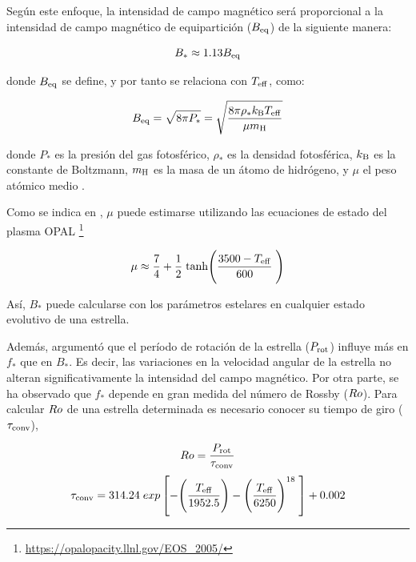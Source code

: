 Según este enfoque, la intensidad de campo magnético será proporcional a la intensidad de campo magnético de equipartición ($B_{\mathrm{eq}}$) de la siguiente manera:
 
\begin{equation}
	B_* \approx 1.13 B_{\mathrm{eq}} \label{eq:mf_bstar}
\end{equation}

donde $B_{\mathrm{eq}}$ se define, y por tanto se relaciona con $T_{\mathrm{eff}}$, como:

\begin{equation}
	B_{\mathrm{eq}} = \sqrt{8\pi P_*} = \sqrt{\frac{8\pi\rho_* k_{\mathrm{B}} T_{\mathrm{eff}}}{\mu m_{\mathrm{H}}}}\label{eq:mf_beq}    
\end{equation}

donde $P_*$ es la presión del gas fotosférico, $\rho_*$ es la densidad fotosférica, $k_{\mathrm{B}}$ es la constante de Boltzmann, $m_{\mathrm{H}}$ es la masa de un átomo de hidrógeno, y $\mu$ el peso atómico medio \citep{Cranmer2011}. \par

Como se indica en \cite{Cranmer2011}, $\mu$ puede estimarse utilizando las ecuaciones de estado del plasma OPAL \footnote{\url{https://opalopacity.llnl.gov/EOS_2005/}}

\begin{equation}
	\mu \approx \frac{7}{4} + \frac{1}{2} \; \textrm{tanh}\Bigg(\frac{3500-T_{\mathrm{eff}}}{600}\;\Bigg) \label{eq:mf_atom_weight}
\end{equation}

Así, $B_*$ puede calcularse con los parámetros estelares en cualquier estado evolutivo de una estrella.\par

Además, \citet{Cranmer2011} argumentó que el período de rotación de la estrella ($P_{\mathrm{rot}}$) influye más en $f_*$ que en $B_*$. Es decir, las variaciones en la velocidad angular de la estrella no alteran significativamente la intensidad del campo magnético. Por otra parte, se ha observado que $f_*$ depende en gran medida del número de Rossby ($Ro$). Para calcular $Ro$ de una estrella determinada es necesario conocer su tiempo de giro ($\tau_{\mathrm{conv}}$),

\begin{equation}
	Ro = \frac{P_{\mathrm{rot}}}{\tau_{\mathrm{conv}}} \label{eq:mf_rossby}
\end{equation}
\begin{equation}
	\tau_{\mathrm{conv}} = 314.24\;exp\left[-\Bigg(\frac{T_{\mathrm{eff}}}{1952.5}\Bigg)-\Bigg(\frac{T_{\mathrm{eff}}}{6250}\Bigg)^{18} \;\right]+0.002 \label{eq:mf_turnover}
\end{equation}

